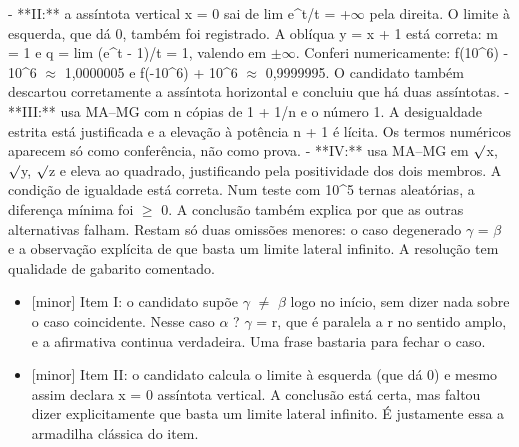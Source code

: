 \documentclass{article}%
\begin{document}
{-} **II:** a assíntota vertical x = 0 sai de lim e\^{}t/t = +$\infty$ pela direita. O limite à esquerda, que dá 0, também foi registrado. A oblíqua y = x + 1 está correta: m = 1 e q = lim (e\^{}t - 1)/t = 1, valendo em $\pm$$\infty$. Conferi numericamente: f(10\^{}6) - 10\^{}6 $\approx$ 1,0000005 e f(-10\^{}6) + 10\^{}6 $\approx$ 0,9999995. O candidato também descartou corretamente a assíntota horizontal e concluiu que há duas assíntotas.\newline%
{-} **III:** usa MA--MG com n cópias de 1 + 1/n e o número 1. A desigualdade estrita está justificada e a elevação à potência n + 1 é lícita. Os termos numéricos aparecem só como conferência, não como prova.\newline%
{-} **IV:** usa MA--MG em $\surd$x, $\surd$y, $\surd$z e eleva ao quadrado, justificando pela positividade dos dois membros. A condição de igualdade está correta. Num teste com 10\^{}5 ternas aleatórias, a diferença mínima foi $\geq$ 0.\newline%
\newline%
A conclusão também explica por que as outras alternativas falham. Restam só duas omissões menores: o caso degenerado $\gamma$ = $\beta$ e a observação explícita de que basta um limite lateral infinito. A resolução tem qualidade de gabarito comentado.%
\begin{itemize}%
\item%
{[}minor{]} Item I: o candidato supõe $\gamma$ $\neq$ $\beta$ logo no início, sem dizer nada sobre o caso coincidente. Nesse caso $\alpha$ ? $\gamma$ = r, que é paralela a r no sentido amplo, e a afirmativa continua verdadeira. Uma frase bastaria para fechar o caso.%
\item%
{[}minor{]} Item II: o candidato calcula o limite à esquerda (que dá 0) e mesmo assim declara x = 0 assíntota vertical. A conclusão está certa, mas faltou dizer explicitamente que basta um limite lateral infinito. É justamente essa a armadilha clássica do item.%
\end{itemize}%
\end{document}
